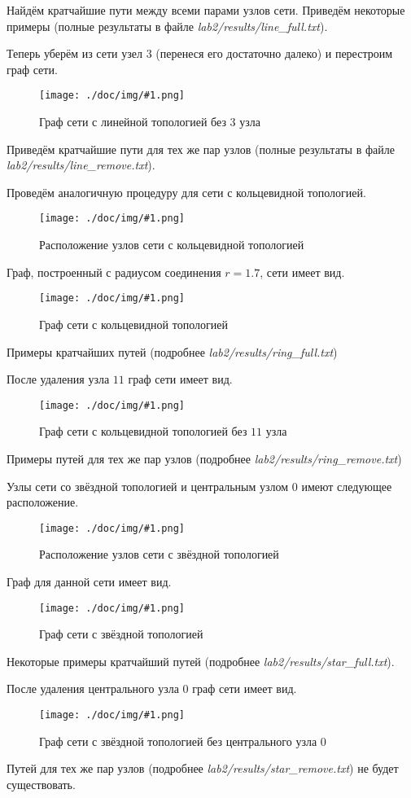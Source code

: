\documentclass[a4paper,12pt]{article}
\newcommand{\plot}[3]{
    \label{#3}
    \begin{figure}[H]
        \begin{center}
            \texttt{[image: ./doc/img/\#1.png]}
            \caption{#2}
        \end{center}
    \end{figure}
}
\begin{document}
    Найдём кратчайшие пути между всеми парами узлов сети.
    Приведём некоторые примеры (полные результаты в файле \textsl{lab2/results/line\_full.txt}).
    
    

    Теперь уберём из сети узел $ 3 $ (перенеся его достаточно далеко)
    и перестроим граф сети.
    \plot{rm_line}{Граф сети с линейной топологией без $ 3 $ узла}{p:rmLine}

    Приведём кратчайшие пути для тех же пар узлов (полные результаты в файле \textsl{lab2/results/line\_remove.txt}).
    
    

    Проведём аналогичную процедуру для сети с кольцевидной топологией.
    \plot{full_ring_points}{Расположение узлов сети с кольцевидной топологией}{p:fullRingPoints}

    Граф, построенный с радиусом соединения $ r = 1.7 $, сети имеет вид.
    \plot{full_ring}{Граф сети с кольцевидной топологией}{p:fullRing}

    Примеры кратчайших путей (подробнее \textsl{lab2/results/ring\_full.txt})

    

    После удаления узла $ 11 $ граф сети имеет вид.
    \plot{rm_ring}{Граф сети с кольцевидной топологией без $ 11 $ узла}{p:rmRing}

    Примеры путей для тех же пар узлов (подробнее \textsl{lab2/results/ring\_remove.txt})
    
    

    Узлы сети со звёздной топологией и центральным узлом $ 0 $ имеют следующее расположение.
    \plot{full_star_points}{Расположение узлов сети с звёздной топологией}{p:fullStarPoints}

    Граф для данной сети имеет вид.
    \plot{full_star}{Граф сети с звёздной топологией}{p:fullStar}

    Некоторые примеры кратчайший путей (подробнее \textsl{lab2/results/star\_full.txt}).
    
    

    После удаления центрального узла $ 0 $ граф сети имеет вид.
    \plot{rm_star}{Граф сети с звёздной топологией без центрального узла $ 0 $}{p:rmStar}

    Путей для тех же пар узлов (подробнее \textsl{lab2/results/star\_remove.txt})
    не будет существовать.
\end{document}
